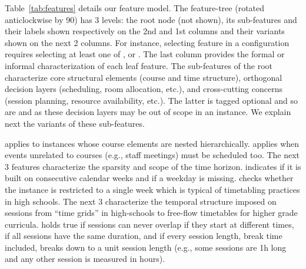 Table~\ref{tab:features} details our feature model.
The feature-tree (rotated anticlockwise by 90\textdegree) has 3 levels:
the root node (not shown),
its sub-features and their labels
shown respectively on the 2nd and 1st columns 
and their variants shown on the next 2 columns.
For instance, selecting feature \hyperref[featmodel:hosting]{\hosting}
in a configuration requires selecting at least one of
\hyperref[featmodel:noroom]{\noroom}, 
\hyperref[featmodel:singleroom]{\singleroom} or
\hyperref[featmodel:multiroom]{\multiroom}.
The last column provides the formal or informal characterization of each leaf feature.
The sub-features of the root 
characterize core structural elements (course and time structure),
orthogonal decision layers (scheduling, room allocation, etc.),
and cross-cutting concerns (session planning, resource availability, etc.).
The latter is tagged optional
and so are
\hyperref[featmodel:hosting]{\hosting} and
\hyperref[featmodel:teaching]{\teaching}
as these decision layers may be out of scope in an instance.
We explain next the variants of these sub-features.

\hyperref[featmodel:hierarchy]{\coursehierarchy} applies to instances whose
course elements are nested hierarchically.
\hyperref[featmodel:event]{\event} applies when events unrelated to courses 
(e.g., %
staff meetings) must be scheduled too.
The next 3 features characterize the sparsity and scope of the time horizon.
\hyperref[featmodel:fullperiod]{\fullperiod} %
indicates if it %
is built on consecutive calendar weeks
and \hyperref[featmodel:fullweek]{\fullweek} %
if a weekday is missing. 
\hyperref[featmodel:singleweek]{\singleweek} checks whether the instance is restricted to a single week
which is typical of timetabling practices in high schools. %
The next 3 characterize the temporal structure imposed on sessions from ``time grids'' in high-schools
to free-flow timetables for higher grade curricula.
\hyperref[featmodel:nooverlap]{\nooverlap} holds true
if sessions can never overlap if they start at different times,
\hyperref[featmodel:sameduration]{\sameduration} %
if all sessions have the same duration,
and \hyperref[featmodel:synchronous]{\synchronous} %
if every session length, break time included, breaks down to a unit session length
(e.g., some sessions are 1h long and any other session is measured in hours).

